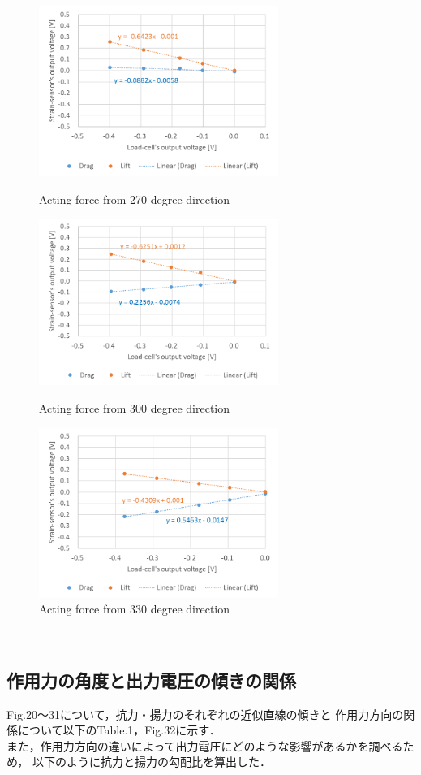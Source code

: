\documentclass[twocolumn,a4j]{jsarticle}
\begin{document}
\begin{figure}[htbp]
    \footnotesize
    \begin{center}
        \includegraphics[width=78mm]{../images/270.png}
        \caption{Acting force from 270 degree direction}
        \includegraphics[width=78mm]{../images/300.png}
        \caption{Acting force from 300 degree direction}
        \includegraphics[width=78mm]{../images/330.png}
        \caption{Acting force from 330 degree direction}
    \end{center}
\end{figure}
　
\newpage
\;
\newpage

\subsection{作用力の角度と出力電圧の傾きの関係}

Fig.20～31について，抗力・揚力のそれぞれの近似直線の傾きと
作用力方向の関係について以下のTable.1，Fig.32に示す．\\
また，作用力方向の違いによって出力電圧にどのような影響があるかを調べるため，
以下のように抗力と揚力の勾配比を算出した．\\
\end{document}
